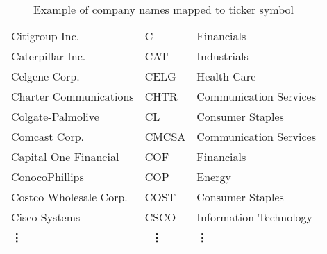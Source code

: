 \begin{table}[p]
\begin{tabular}{@{}lll@{}}
Citigroup Inc.                    & C     & Financials             \\
Caterpillar Inc.                  & CAT   & Industrials            \\
Celgene Corp.                     & CELG  & Health Care            \\
Charter Communications            & CHTR  & Communication Services \\
Colgate-Palmolive                 & CL    & Consumer Staples       \\
Comcast Corp.                     & CMCSA & Communication Services \\
Capital One Financial             & COF   & Financials             \\
ConocoPhillips                    & COP   & Energy                 \\
Costco Wholesale Corp.            & COST  & Consumer Staples       \\
Cisco Systems                     & CSCO  & Information Technology \\ 
\multicolumn{1}{l}{\bf \qquad\vdots} & \multicolumn{1}{l}{\bf\ \vdots} & \multicolumn{1}{l}{\bf\qquad\vdots}   \\\bottomrule
\end{tabular}
\caption{Example of company names mapped to ticker symbol}
\label{tab:industries}
\end{table}

